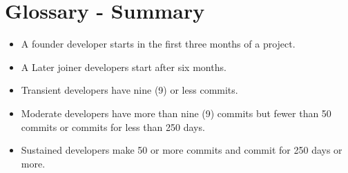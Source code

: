 \section{Glossary - Summary} 
\begin{itemize} 
 \item A founder developer starts in the first three months of a project. 
\item  A Later joiner developers start after six months. 
\item Transient developers have nine (9) or less commits. 
\item Moderate developers have more than nine (9) commits but fewer than 50 commits or commits for less than 250 days. 
\item Sustained developers make 50 or more commits and commit for 250 days or more. 
\end{itemize} 
\newpage 

